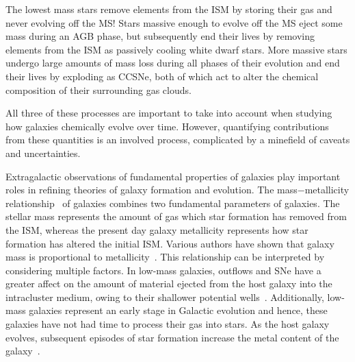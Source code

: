 The lowest mass stars remove elements from the ISM by storing their gas and never evolving off the MS!
Stars massive enough to evolve off the MS eject some mass during an AGB phase, but subsequently end their lives by removing elements from the ISM as passively cooling white dwarf stars.
More massive stars undergo large amounts of mass loss during all phases of their evolution and end their lives by exploding as CCSNe, both of which act to alter the chemical composition of their surrounding gas clouds.

All three of these processes are important to take into account when studying how galaxies chemically evolve over time.
However, quantifying contributions from these quantities is an involved process, complicated by a minefield of caveats and uncertainties.

Extragalactic observations of fundamental properties of galaxies play important roles in refining theories of galaxy formation and evolution.
The mass$-$metallicity relationship~\citep[MZR;][]{Lequeux79} of galaxies combines two fundamental parameters of galaxies.
The stellar mass represents the amount of gas which star formation has removed from the ISM, whereas the present day galaxy metallicity represents how star formation has altered the initial ISM.
Various authors have shown that galaxy mass is proportional to metallicity~\citep{Tremonti04, Maiolino08,Kewley08}.
This relationship can be interpreted by considering multiple factors.
In low-mass galaxies, outflows and SNe have a greater affect on the amount of material ejected from the host galaxy into the intracluster medium, owing to their shallower potential wells~\citep[e.g.][]{Tremonti04}.
Additionally, low-mass galaxies represent an early stage in Galactic evolution and hence, these galaxies have not had time to process their gas into stars.
As the host galaxy evolves, subsequent episodes of star formation increase the metal content of the galaxy~\citep[e.g.][and references therein]{Maiolino08}.

